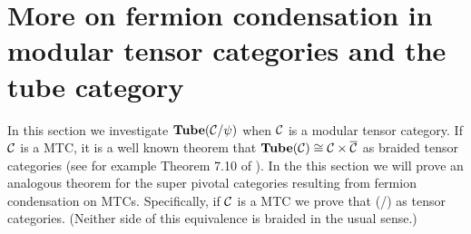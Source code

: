 
\section{More on fermion condensation in modular tensor categories and the tube category} \label{more_on_tubes}


In this section we investigate $\textbf{Tube}(\mathcal{C}/\psi)$ when $\mathcal{C}$ is a modular tensor category.
If $\mathcal{C}$ is a MTC, it is a well known theorem that $\textbf{Tube}(\mathcal{C}) \cong \mathcal{C} \times \overline{\mathcal{C}}$ as braided tensor categories
(see for example Theorem 7.10 of \cite{muger2003b}). 
In the this section we will prove an analogous theorem for the super pivotal categories resulting from fermion condensation on MTCs.
Specifically, if $\mathcal{C}$ is a MTC we prove that 
\be \label{tube_theorem_teaser}
	\tube(\mcc/\psi) \cong \mcc \times \overline{\mcc/\psi}
\ee 
as tensor categories.
(Neither side of this equivalence is braided in the usual sense.)


